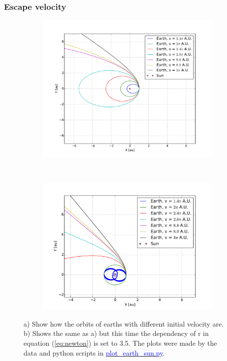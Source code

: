 \subsubsection{Escape velocity}



\begin{figure}[H]
    \centering
    \begin{subfigure}{0.5\textwidth}
        \centering
        \includegraphics[width=\linewidth]{result/bilder/escape-velocity.pdf}
    	\caption{}
    \end{subfigure}%
    ~ 
    \begin{subfigure}{0.5\textwidth}
        \centering
        \includegraphics[width=\linewidth]{result/bilder/escape-velocity-r25.pdf}
        \caption{}
    \end{subfigure}
    \caption{a) Show how the orbits of earths with different initial velocity are. b) Shows the same as a) but this time the dependency of r in equation (\ref{eq:newton}) is set to 3.5. The plots were made by the data and python scripts in \href{https://github.com/erikfsk/Project-3/tree/master/Project3/escape-velocity}{\textcolor{blue}{plot\_earth\_sun.py}}.}
    \label{fig:escape-velocity-low}
\end{figure}



